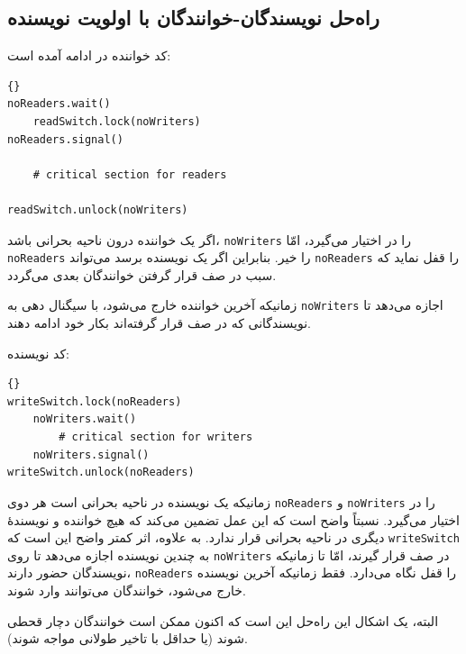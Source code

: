 \documentclass{book}
\newcommand{\clearemptydoublepage}{\newpage\cleardoublepage}
\begin{document}
\clearemptydoublepage
\subsection{راه‌حل نویسندگان-خوانندگان با اولویت نویسنده}


    کد خواننده در ادامه آمده است:

\begin{latin}
\begin{lstlisting}[title=\rl{راه‌حل خواننده با اولویت نویسنده}]{}
noReaders.wait()
    readSwitch.lock(noWriters)
noReaders.signal()

    # critical section for readers

readSwitch.unlock(noWriters)
\end{lstlisting}
\end{latin}

    اگر یک خواننده درون ناحیه بحرانی باشد، {\tt noWriters} را در اختیار می‌گیرد، امّا {\tt noReaders} را خیر. 
    بنابراین اگر یک نویسنده برسد می‌تواند {\tt noReaders} را قفل نماید که سبب در صف قرار گرفتن خوانندگان بعدی می‌گردد. 

    زمانیکه آخرین خواننده خارج می‌شود، با سیگنال دهی به {\tt noWriters} اجازه می‌دهد تا نویسندگانی که در صف قرار گرفته‌اند بکار خود ادامه دهند. 

    کد نویسنده: 

\begin{latin}
\begin{lstlisting}[title=\rl{راه‌حل نویسنده با اولویت نویسنده}]{}
writeSwitch.lock(noReaders)
    noWriters.wait()
        # critical section for writers
    noWriters.signal()
writeSwitch.unlock(noReaders)
\end{lstlisting}
\end{latin}

    زمانیکه یک نویسنده در ناحیه بحرانی است هر دوی {\tt noReaders} و {\tt noWriters} را در اختیار می‌گیرد. 
    نسبتاً واضح است که این عمل تضمین می‌کند که هیچ خواننده و نویسندهٔ دیگری در ناحیه بحرانی قرار ندارد. 
    به علاوه، اثر کمتر واضح این است که {\tt writeSwitch} به چندین نویسنده اجازه می‌دهد تا روی {\tt noWriters} در صف قرار گیرند،‌ 
    امّا تا زمانیکه نویسندگان حضور دارند،   {\tt noReaders} را قفل نگاه می‌دارد. 
    فقط زمانیکه آخرین نویسنده خارج می‌شود، خوانندگان می‌توانند وارد شوند. 

    البته، یک اشکال این راه‌حل این است که اکنون ممکن است خوانندگان دچار قحطی شوند (یا حداقل با تاخیر طولانی مواجه شوند).  
\end{document}
